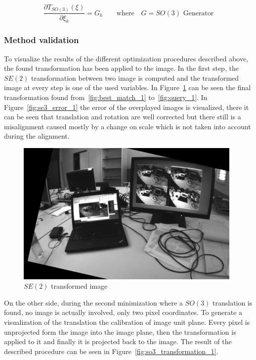 \begin{equation}
  \frac{\partial T_{SO(3)}(\xi)}{\partial \xi_k}  = G_k \qquad \text{where} \quad G = \text{$SO(3)$ Generator}
\end{equation}


\subsubsection{Method validation}
\label{ssub:esm_method_validation}

To visualize the results of the different optimization procedures described above, the found transformation has been applied to the image. In the first step, the $SE(2)$ transformation between two image is computed and the transformed image at every step is one of the used variables. In Figure~\ref{fig:se2_transformation_1} can be seen the final transformation found from~\ref{fig:best_match_1} to~\ref{fig:query_1}. In Figure~\ref{fig:se3_error_1} the error of the overplayed images is visualized, there it can be seen that translation and rotation are well corrected but there still is a misalignment caused mostly by a change on scale which is not taken into account during the alignment.\\

\begin{figure}[htpb]
  \centering
  \includegraphics[width=11cm]{img/se2_transformation_1.png}
  \caption{$SE(2)$ transformed image}
  \label{fig:se2_transformation_1}
\end{figure}

On the other side, during the second minimization where a $SO(3)$ translation is found, no image is actually involved, only two pixel coordinates. To generate a visualization of the translation the calibration of image unit plane. Every pixel is unprojected form the image into the image plane, then the transformation is applied to it and finally it is projected back to the image. The result of the described procedure can be seen in Figure~\ref{fig:so3_transformation_1}.\\

